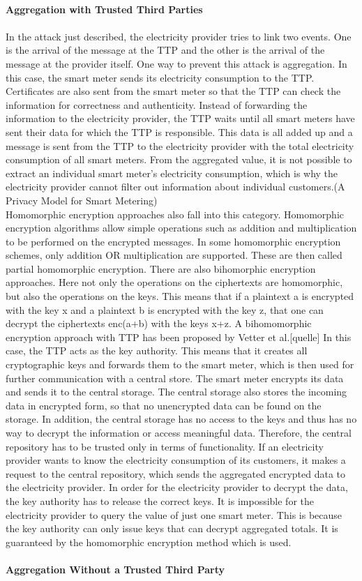 \\
\textbf{Aggregation with Trusted Third Parties}
\\
\\
In the attack just described, the electricity provider tries to link two events. One is the arrival of the message at the TTP and the other is the arrival of the message at the provider itself. One way to prevent this attack is aggregation. In this case, the smart meter sends its electricity consumption to the TTP. Certificates are also sent from the smart meter so that the TTP can check the information for correctness and authenticity. Instead of forwarding the information to the electricity provider, the TTP waits until all smart meters have sent their data for which the TTP is responsible. This data is all added up and a message is sent from the TTP to the electricity provider with the total electricity consumption of all smart meters. From the aggregated value, it is not possible to extract an individual smart meter's electricity consumption, which is why the electricity provider cannot filter out information about individual customers.(A Privacy Model for Smart Metering)\\
Homomorphic encryption approaches also fall into this category. Homomorphic encryption algorithms allow simple operations such as addition and multiplication to be performed on the encrypted messages.  In some homomorphic encryption schemes, only addition OR multiplication are supported. These are then called partial homomorphic encryption.
There are also bihomorphic encryption approaches. Here not only the operations on the ciphertexts are homomorphic, but also the operations on the keys. This means that if a plaintext a is encrypted with the key x and a plaintext b is encrypted with the key z, that one can decrypt the ciphertexts enc(a+b) with the keys x+z. A bihomomorphic encryption approach with TTP has been proposed by Vetter et al.[quelle] In this case, the TTP acts as the key authority. This means that it creates all cryptographic keys and forwards them to the smart meter, which is then used for further communication with a central store. The smart meter encrypts its data and sends it to the central storage. The central storage also stores the incoming data in encrypted form, so that no unencrypted data can be found on the storage. In addition, the central storage has no access to the keys and thus has no way to decrypt the information or access meaningful data.
Therefore, the central repository has to be trusted only in terms of functionality. If an electricity provider wants to know the electricity consumption of its customers, it makes a request to the central repository, which sends the aggregated encrypted data to the electricity provider. In order for the electricity provider to decrypt the data, the key authority has to release the correct keys. It is impossible for the electricity provider to query the value of just one smart meter. This is because the key authority can only issue keys that can decrypt aggregated totals. It is guaranteed by the homomorphic encryption method which is used.
\\
\\
\textbf{Aggregation Without a Trusted Third Party}
\\
\\




\cleardoublepage

